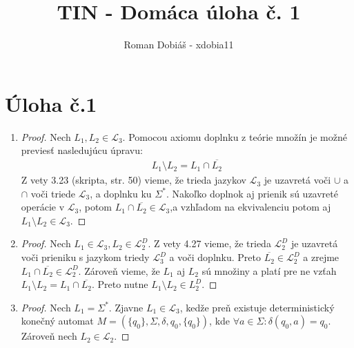 \documentclass[10pt]{article}
\begin{document}
 
 
 
\title{TIN - Domáca úloha č. 1}%
\author{Roman Dobiáš - xdobia11}
 
\maketitle

\section*{Úloha č.1}
\begin{enumerate}
\item 
    \begin{proof}
    Nech $L_1, L_2 \in \mathcal{L}_3$. 
    Pomocou axiomu doplnku z teórie množín je možné previesť nasledujúcu úpravu:
        \begin{align*}
            L_1 \setminus L_2 = L_1 \cap \overline{L_2}
        \end{align*}
    Z vety 3.23 (skripta, str. 50) vieme, že trieda jazykov $\mathcal{L}_3$ je uzavretá voči
    $\cup$ a $\cap$ voči triede $\mathcal{L}_3$, a doplnku ku $\Sigma^{*}$.
            Nakoľko doplnok aj prienik sú uzavreté operácie v $\mathcal{L}_3$, potom $L_1 \cap
    \overline{L_2} \in \mathcal{L}_3$,a vzhľadom na ekvivalenciu potom aj $L_1 \setminus L_2 \in
    \mathcal{L}_3$. 
    \end{proof}
\item 
    \begin{proof}
    Nech $L_1 \in \mathcal{L}_3, L_2 \in \mathcal{L}_2^D$. Z vety 4.27 vieme, že trieda
        $\mathcal{L}_2^D$ je uzavretá voči prieniku s jazykom triedy $\mathcal{L}_3^D$ a voči
        doplnku. 
        Preto $\overline{L_2} \in \mathcal{L}_2^D$ a zrejme $L_1 \cap \overline{L_2} \in
        \mathcal{L}_2^D$. Zároveň vieme, že $L_1$ aj $L_2$ sú množiny a platí pre ne vzťah $L_1
        \setminus L_2 = L_1\cap \overline{L_2}$. Preto nutne $L_1\setminus L_2 \in L_2^D$.
    \end{proof}

\item 
    \begin{proof}
    Nech $L_1 = \Sigma^*$. Zjavne $L_1 \in \mathcal{L}_3$, kedže preň existuje deterministický konečný automat $M =
        (\{q_0\},\Sigma, \delta, q_0, \{q_0\})$, kde $\forall a \in \Sigma : \delta(q_0, a) = q_0$.
    Zároveň nech $L_2 \in \mathcal{L}_2$.


\end{proof}
\end{enumerate}
\end{document}
